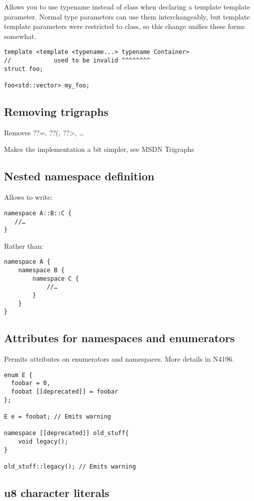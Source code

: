 Allows you to use typename instead of class when declaring a template template parameter. Normal type parameters can use them interchangeably, but template template parameters were restricted to class, so this change unifies these forms somewhat.

\begin{verbatim}
template <template <typename...> typename Container>
//            used to be invalid ^^^^^^^^
struct foo;

foo<std::vector> my_foo;
\end{verbatim}

\subsection{Removing trigraphs}

Removes ??=, ??(, ??>, … 

Makes the implementation a bit simpler, see MSDN Trigraphs

\subsection{Nested namespace definition}

Allows to write:

\begin{verbatim}
namespace A::B::C {
   //…
}
\end{verbatim}

Rather than:

\begin{verbatim}
namespace A {
    namespace B {
        namespace C {
            //…
        }
    }
}
\end{verbatim}


\subsection{Attributes for namespaces and enumerators}

Permits attributes on enumerators and namespaces. More details in N4196.
\begin{verbatim}
enum E {
  foobar = 0,
  foobat [[deprecated]] = foobar
};

E e = foobat; // Emits warning

namespace [[deprecated]] old_stuff{
    void legacy();
}

old_stuff::legacy(); // Emits warning
\end{verbatim}

\subsection{u8 character literals}

